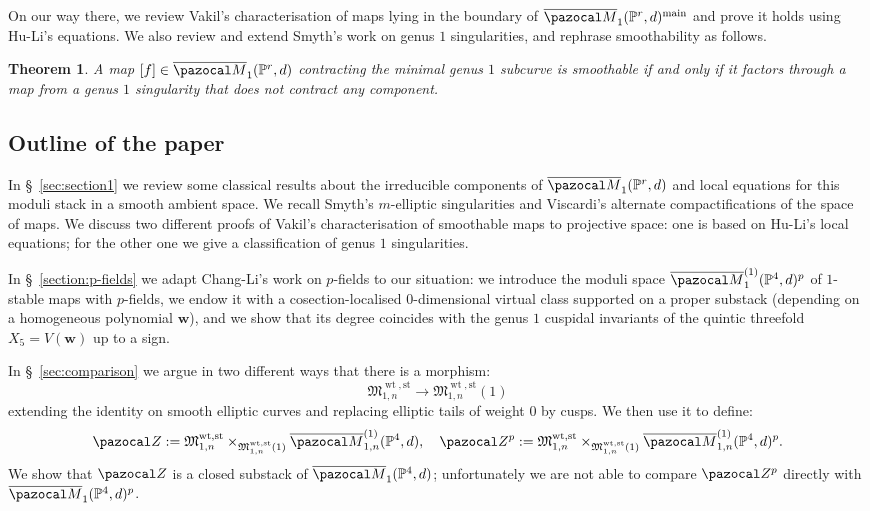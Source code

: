 \documentclass[11pt]{amsart}
\newcommand{\Mone}[3]{\overline{\pazocal M}^{(1)}_{#1}(#2,#3)}
\newcommand{\PP}{\mathbb P}
\renewcommand{\to}{\rightarrow}
\newcommand{\Z}{\pazocal Z}
\newcommand{\Zp}{\pazocal Z^p}
\newcommand{\oM}{\overline{\pazocal M}}
\newcommand{\w}{\mathbf{w}}
\theoremstyle{plain}
\newtheorem*{teo*}{Theorem}
\theoremstyle{definition}
\begin{document}
On our way there, we review Vakil's characterisation of maps lying in the boundary of $\oM_1(\PP^r,d)^{\rm{main}}$ and prove it holds using Hu-Li's equations. We also review and extend Smyth's work on genus $1$ singularities, and rephrase smoothability as follows.

\begin{teo*}
A map $[f]\in\oM_1(\PP^r,d)$ contracting the minimal genus $1$ subcurve is smoothable if and only if it factors through a map from a genus $1$ singularity that does not contract any component.
\end{teo*}


\subsection{Outline of the paper}
In \S~\ref{sec:section1} we review some classical results about the irreducible components of $\oM_1(\PP^r,d)$ and local equations for this moduli stack in a smooth ambient space. We recall Smyth's $m$-elliptic singularities and Viscardi's alternate compactifications  of the space of maps. We discuss two different proofs of Vakil's characterisation of smoothable maps to projective space: one is based on Hu-Li's local equations; for the other one we give a classification of genus $1$ singularities.

In \S~\ref{section:p-fields} we adapt Chang-Li's work on $p$-fields to our situation: we introduce the moduli space $\Mone{1}{\PP^4}{d}^p$ of $1$-stable maps with $p$-fields, we endow it with a cosection-localised $0$-dimensional virtual class supported on a proper substack (depending on a homogeneous polynomial $\w$), and we show that its degree coincides with the genus $1$ cuspidal invariants of the quintic threefold $X_5=V(\w)$ up to a sign.

In \S~\ref{sec:comparison} we argue in two different ways that there is a morphism:
 \[\mathfrak M_{1,n}^{\operatorname{wt},\text{st}}\to\mathfrak M_{1,n}^{\operatorname{wt},\text{st}}(1)\]
extending the identity on smooth elliptic curves and replacing elliptic tails of weight $0$ by cusps. We then use it to define:
 \[\Z:= \mathfrak M_{1,n}^{\operatorname{wt},\text{st}}\times_{\mathfrak M_{1,n}^{\operatorname{wt},\text{st}}(1)} \oM^{(1)}_{1,n}(\PP^4,d),\quad \Zp:=\mathfrak M_{1,n}^{\operatorname{wt},\text{st}}\times_{\mathfrak M_{1,n}^{\operatorname{wt},\text{st}}(1)} \oM^{(1)}_{1,n}(\PP^4,d)^p.\]
 We show that $\Z$ is a closed substack of $\oM_1(\PP^4,d)$; unfortunately we are not able to compare $\Zp$ directly with $\oM_1(\PP^4,d)^p$.
 
\end{document}
